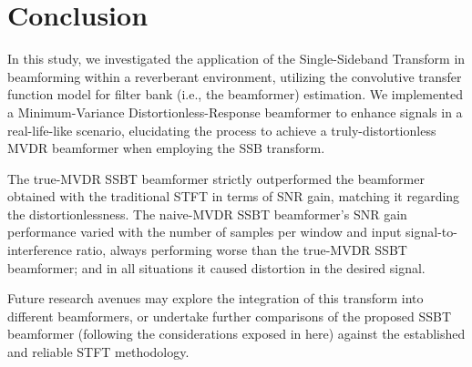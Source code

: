 \section{Conclusion}
\label{sec:conclusion}

In this study, we investigated the application of the Single-Sideband Transform in beamforming within a reverberant environment, utilizing the convolutive transfer function model for filter bank (i.e., the beamformer) estimation. We implemented a Minimum-Variance Distortionless-Response beamformer to enhance signals in a real-life-like scenario, elucidating the process to achieve a truly-distortionless MVDR beamformer when employing the SSB transform.

The true-MVDR SSBT beamformer strictly outperformed the beamformer obtained with the traditional STFT in terms of SNR gain, matching it regarding the distortionlessness. The naive-MVDR SSBT beamformer's SNR gain performance varied with the number of samples per window and input signal-to-interference ratio, always performing worse than the true-MVDR SSBT beamformer; and in all situations it caused distortion in the desired signal.

Future research avenues may explore the integration of this transform into different beamformers, or undertake further comparisons of the proposed SSBT beamformer (following the considerations exposed in here) against the established and reliable STFT methodology.
